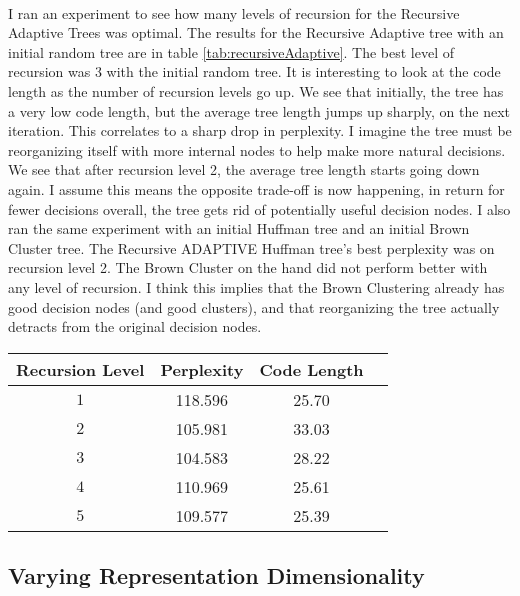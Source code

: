 \paragraph{}
I ran an experiment to see how many levels of recursion for the Recursive Adaptive Trees was optimal. The results for the Recursive Adaptive tree with an initial random tree are in table \ref{tab:recursiveAdaptive}. The best level of recursion was 3 with the initial random tree. It is interesting to look at the code length as the number of recursion levels go up. We see that initially, the tree has a very low code length, but the average tree length jumps up sharply, on the next iteration. This correlates to a sharp drop in perplexity. I imagine the tree must be reorganizing itself with more internal nodes to help make more natural decisions. We see that after recursion level 2, the average tree length starts going down again. I assume this means the opposite trade-off is now happening, in return for fewer decisions overall, the tree gets rid of potentially useful decision nodes. I also ran the same experiment with an initial Huffman tree and an initial Brown Cluster tree. The Recursive ADAPTIVE Huffman tree's best perplexity was on recursion level 2. The Brown Cluster on the hand did not perform better with any level of recursion. I think this implies that the Brown Clustering already has good decision nodes (and good clusters), and that reorganizing the tree actually detracts from the original decision nodes.
\begin{table*} \centering
{}
\begin{tabular}{@{}cccc@{}}\toprule
Recursion Level & Perplexity & Code Length\\ 
\midrule
$1$ & 118.596 & 25.70\\
$2$ & 105.981 & 33.03\\
$3$ & 104.583 & 28.22\\
$4$ & 110.969 & 25.61\\
$5$ & 109.577 & 25.39\\
\bottomrule
\end{tabular}
\caption{The effect of more recursion levels on the Recursive ADAPTIVE tree with an initial random tree}
\label{tab:recursiveAdaptive}
\end{table*}

\subsection{Varying Representation Dimensionality}
